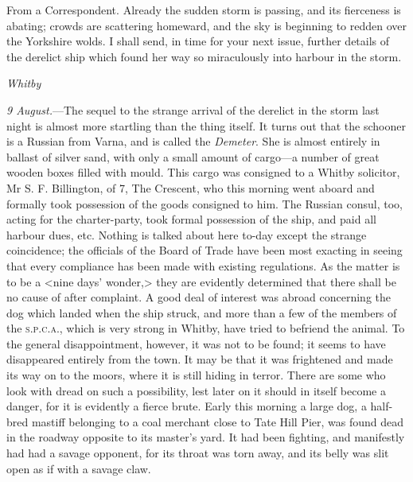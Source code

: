\begin{newspaper}{}{From a Correspondent.}
Already the sudden storm is passing, and its fierceness is abating; crowds are scattering homeward, and the sky is beginning to redden over the Yorkshire wolds. I shall send, in time for your next issue, further details of the derelict ship which found her way so miraculously into harbour in the storm.

\begin{flushright}\itshape Whitby\end{flushright}

\noindent\textit{9 August.}—The sequel to the strange arrival of the derelict in the storm last night is almost more startling than the thing itself. It turns out that the schooner is a Russian from Varna, and is called the \textit{Demeter}. She is almost entirely in ballast of silver sand, with only a small amount of cargo—a number of great wooden boxes filled with mould. This cargo was consigned to a Whitby solicitor, Mr S\@. F\@. Billington, of 7, The Crescent, who this morning went aboard and formally took possession of the goods consigned to him. The Russian consul, too, acting for the charter-party, took formal possession of the ship, and paid all harbour dues, etc. Nothing is talked about here to-day except the strange coincidence; the officials of the Board of Trade have been most exacting in seeing that every compliance has been made with existing regulations. As the matter is to be a <nine days' wonder,> they are evidently determined that there shall be no cause of after complaint. A good deal of interest was abroad concerning the dog which landed when the ship struck, and more than a few of the members of the \textsc{s.p.c.a.}, which is very strong in Whitby, have tried to befriend the animal. To the general disappointment, however, it was not to be found; it seems to have disappeared entirely from the town. It may be that it was frightened and made its way on to the moors, where it is still hiding in terror. There are some who look with dread on such a possibility, lest later on it should in itself become a danger, for it is evidently a fierce brute. Early this morning a large dog, a half-bred mastiff belonging to a coal merchant close to Tate Hill Pier, was found dead in the roadway opposite to its master's yard. It had been fighting, and manifestly had had a savage opponent, for its throat was torn away, and its belly was slit open as if with a savage claw.

 


\end{newspaper}
